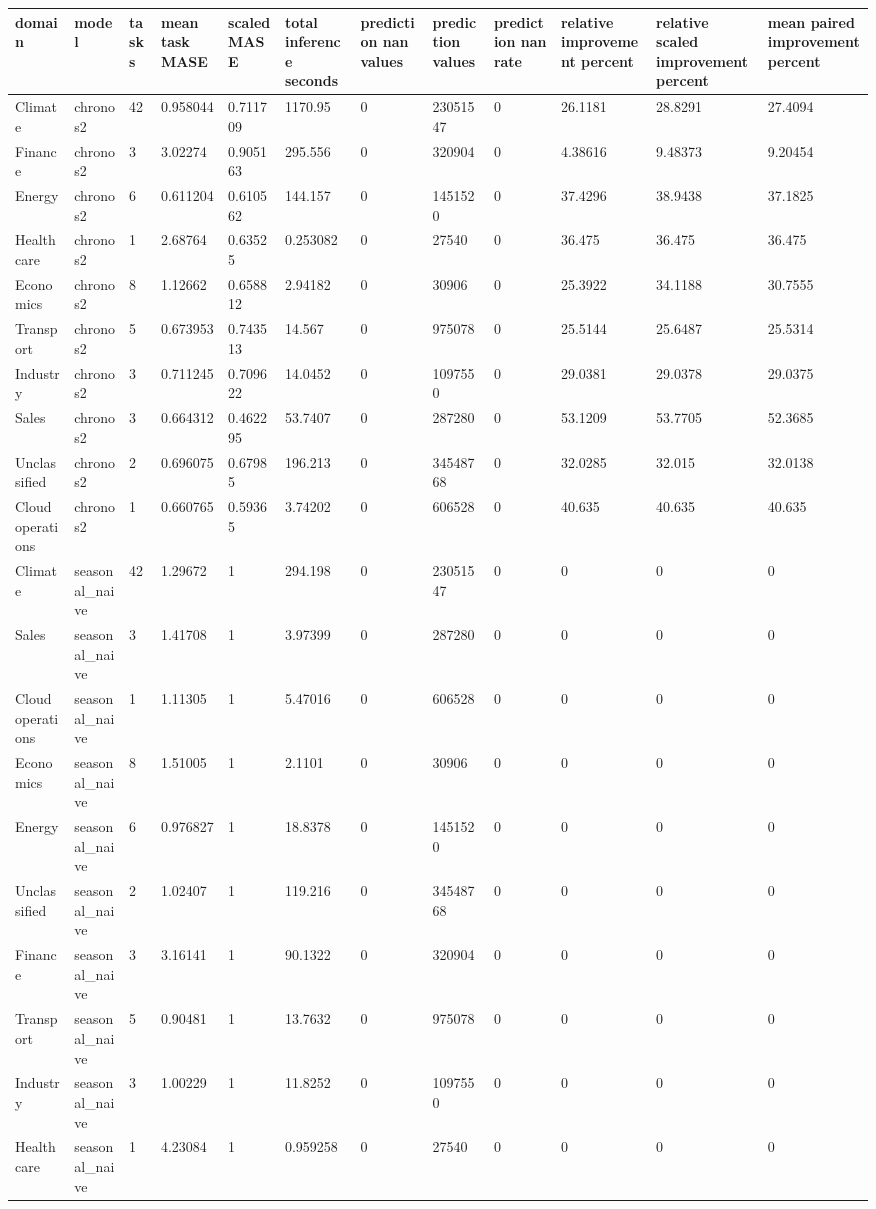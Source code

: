 \begin{tabular}{llllllllllll}
\toprule
domain & model & tasks & mean task MASE & scaled MASE & total inference seconds & prediction nan values & prediction values & prediction nan rate & relative improvement percent & relative scaled improvement percent & mean paired improvement percent \\
\midrule
Climate & chronos2 & 42 & 0.958044 & 0.711709 & 1170.95 & 0 & 23051547 & 0 & 26.1181 & 28.8291 & 27.4094 \\
Finance & chronos2 & 3 & 3.02274 & 0.905163 & 295.556 & 0 & 320904 & 0 & 4.38616 & 9.48373 & 9.20454 \\
Energy & chronos2 & 6 & 0.611204 & 0.610562 & 144.157 & 0 & 1451520 & 0 & 37.4296 & 38.9438 & 37.1825 \\
Healthcare & chronos2 & 1 & 2.68764 & 0.63525 & 0.253082 & 0 & 27540 & 0 & 36.475 & 36.475 & 36.475 \\
Economics & chronos2 & 8 & 1.12662 & 0.658812 & 2.94182 & 0 & 30906 & 0 & 25.3922 & 34.1188 & 30.7555 \\
Transport & chronos2 & 5 & 0.673953 & 0.743513 & 14.567 & 0 & 975078 & 0 & 25.5144 & 25.6487 & 25.5314 \\
Industry & chronos2 & 3 & 0.711245 & 0.709622 & 14.0452 & 0 & 1097550 & 0 & 29.0381 & 29.0378 & 29.0375 \\
Sales & chronos2 & 3 & 0.664312 & 0.462295 & 53.7407 & 0 & 287280 & 0 & 53.1209 & 53.7705 & 52.3685 \\
Unclassified & chronos2 & 2 & 0.696075 & 0.67985 & 196.213 & 0 & 34548768 & 0 & 32.0285 & 32.015 & 32.0138 \\
Cloud operations & chronos2 & 1 & 0.660765 & 0.59365 & 3.74202 & 0 & 606528 & 0 & 40.635 & 40.635 & 40.635 \\
Climate & seasonal\_naive & 42 & 1.29672 & 1 & 294.198 & 0 & 23051547 & 0 & 0 & 0 & 0 \\
Sales & seasonal\_naive & 3 & 1.41708 & 1 & 3.97399 & 0 & 287280 & 0 & 0 & 0 & 0 \\
Cloud operations & seasonal\_naive & 1 & 1.11305 & 1 & 5.47016 & 0 & 606528 & 0 & 0 & 0 & 0 \\
Economics & seasonal\_naive & 8 & 1.51005 & 1 & 2.1101 & 0 & 30906 & 0 & 0 & 0 & 0 \\
Energy & seasonal\_naive & 6 & 0.976827 & 1 & 18.8378 & 0 & 1451520 & 0 & 0 & 0 & 0 \\
Unclassified & seasonal\_naive & 2 & 1.02407 & 1 & 119.216 & 0 & 34548768 & 0 & 0 & 0 & 0 \\
Finance & seasonal\_naive & 3 & 3.16141 & 1 & 90.1322 & 0 & 320904 & 0 & 0 & 0 & 0 \\
Transport & seasonal\_naive & 5 & 0.90481 & 1 & 13.7632 & 0 & 975078 & 0 & 0 & 0 & 0 \\
Industry & seasonal\_naive & 3 & 1.00229 & 1 & 11.8252 & 0 & 1097550 & 0 & 0 & 0 & 0 \\
Healthcare & seasonal\_naive & 1 & 4.23084 & 1 & 0.959258 & 0 & 27540 & 0 & 0 & 0 & 0 \\
\bottomrule
\end{tabular}
